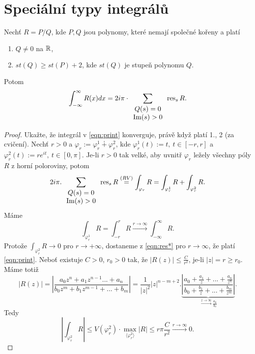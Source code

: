 \section{Speciální typy integrálů} \setcounter{equation}{0}
\begin{theorem}
Nechť $R=P/Q$, kde $P,Q$ jsou polynomy, které nemají společné kořeny a platí 
\begin{enumerate}
    \item $Q\neq0$ na $\operatorname{\mathbb{R}} $,
    \item $st(Q)\geq st(P)+2$, kde $st(Q)$ je stupeň polynomu $Q$.
\end{enumerate}
Potom
\begin{equation}
    \int_{-\infty}^\infty{R(x)dx}=2i\pi\cdot\sum_{\begin{array}{cc}
         Q(s)=0  \\
         \operatorname{Im}(s)>0 
    \end{array}}{\operatorname{res}_s{R}}.
    \label{eqn:print}
\end{equation}
\end{theorem}
\begin{proof}
Ukažte, že integrál v \cref{eqn:print} konverguje, právě když platí 1., 2 (za cvičení). Nechť $r>0$ a $\varphi_r:=\varphi^1_r\dotplus\varphi^2_r$, kde $\varphi^1_r(t):=t,\ t\in[-r,r]$ a $\varphi^2_r(t):=re^{it},\ t\in[0,\pi]$. Je-li $r>0$ tak velké, aby uvnitř $\varphi_r$ ležely všechny póly $R$ z horní poloroviny, potom
\begin{equation}
    2i\pi.\sum_{\begin{array}{cc}
         Q(s)=0  \\
         \operatorname{Im}(s)>0 
    \end{array}}{\operatorname{res}_s{R}}
    \overset{(RV)}{=}
    \int_{\varphi_r}{R}=
    \int_{\varphi_r^1}{R} +\int_{\varphi_r^2}{R}.
    \label{eqn:res*}
\end{equation}
Máme 
$$\int_{\varphi_r^1}{R}=
\int_{-r}^r{R}\overset{r\to\infty}{\longrightarrow}
\int_{-\infty}^\infty{R}.$$
Protože $\int_{\varphi_r^2}{R}\to{0}$ pro $r\to{+\infty}$, dostaneme z \cref{eqn:res*} pro $r\to\infty$, že platí \cref{eqn:print}.  Neboť existuje $C>0$, $r_0>0$ tak, že $|R(z)|\leq\frac{C}{r^2}$, je-li $|z|=r\geq{r_0}$. Máme totiž
$$|R(z)|=\left|\frac{a_0 z^n+a_1 z^{n-1}...+a_n}{b_0 z^m+b_1 z^{m-1}+...+b_m}\right|=\frac{1}{|z|^2}|z|^{n-m+2}.\underset{\overset{z\to\infty}{\longrightarrow}\frac{a_0}{b_0}}{\underbrace{\left|\frac{a_0+\frac{a_1}{z}+...+\frac{a_n}{z^n}}{b_0+\frac{b_1}{z}+...+\frac{b_m}{z^m}}\right|}}.$$
Tedy
$$\left|\int_{\varphi^2_r}{R}\right|\leq V(\varphi^2_r)\cdot\max_{\langle{\varphi^2_r}\rangle}{|R|}
\leq r\pi\frac{C}{r^2}\overset{r\to\infty}{\longrightarrow}0.$$
\end{proof}

